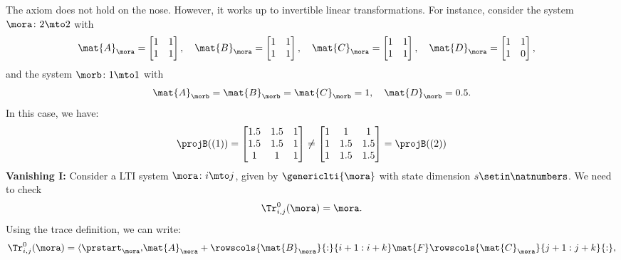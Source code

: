 {\begin{example}
        The axiom does not hold on the nose.
        However, it works up to invertible linear transformations.
        For instance, consider the system $\mora \colon 2\mto 2$ with
        \begin{equation*}
            \mat{A}_\mora = \begin{bmatrix} 1&1\\ 1&1\end{bmatrix},\quad
            \mat{B}_\mora = \begin{bmatrix} 1&1\\ 1&1\end{bmatrix},\quad
            \mat{C}_\mora = \begin{bmatrix} 1&1\\ 1&1\end{bmatrix},\quad
            \mat{D}_\mora = \begin{bmatrix} 1&1\\ 1&0\end{bmatrix},\quad
        \end{equation*}
        and the system $\morb\colon 1\mto 1$ with
        \begin{equation*}
            \mat{A}_\morb=\mat{B}_\morb=\mat{C}_\morb=1,\quad \mat{D}_\morb=0.5.
        \end{equation*}
        In this case, we have:
        \begin{equation*}
            \projB((1))=\begin{bmatrix}1.5&1.5&1\\ 1.5&1.5&1\\ 1&1&1 \end{bmatrix}\neq
            \begin{bmatrix}1&1&1\\ 1&1.5&1.5\\ 1&1.5&1.5 \end{bmatrix}=\projB((2))
        \end{equation*}
        \textbf{Vanishing I:}
        Consider a LTI system $\mora\colon i\mto j$, given by $\genericlti{\mora}$ with state dimension $s\setin \natnumbers$.
        We need to check
        \begin{equation*}
            \Tr_{i,j}^0 (\mora)=\mora.
        \end{equation*}
        Using the trace definition, we can write:
        \begin{equation*}
            \begin{aligned}
                \Tr_{i,j}^0 (\mora)=\langle\prstart_{\mora}, & \mat{A}_\mora+\rowscols{\mat{B}_{\mora}}{:}{i+1:i+k}\mat{F}\rowscols{\mat{C}_{\mora}}{j+1:j+k}{:}, \\

\end{aligned}
\end{equation*}
\end{example}}
